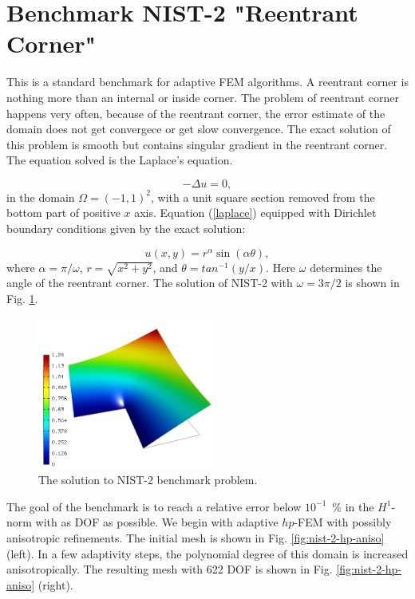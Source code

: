 \section{Benchmark NIST-2 "Reentrant Corner"}
\label{sec:bench-2}

This is a standard benchmark for adaptive FEM algorithms.
A reentrant corner is nothing more than an internal or inside corner.
The problem of reentrant corner happens very often,
because of the reentrant corner, the error estimate
of the domain does not get convergece or get slow convergence.
The exact solution of this problem is smooth but contains
singular gradient in the reentrant corner.
The equation solved is the Laplace's equation.

\begin{equation} \label{laplace}
-\Delta u = 0,
\end{equation}
in the domain $\Omega = (-1, 1)^2$, with a unit square
section removed from the bottom part of positive $x$ axis.
Equation (\ref{laplace}) equipped with Dirichlet
boundary conditions given by the exact solution:

\begin{equation}\label{exact-nist-2}
u(x, y) = r^{\alpha}\sin(\alpha \theta),
\end{equation}
where $\alpha = \pi / \omega$, $r = \sqrt{x^2+y^2}$,
and $\theta = tan^{-1}(y/x)$. Here $\omega $ determines
the angle of the reentrant corner.
The solution of NIST-2 with $\omega = 3 \pi / 2$
is shown in Fig. \ref{fig:sln-nist02}.

\begin{figure}[!ht]
\centering
\includegraphics[height=5cm]{nist/nist-2/solution.png}
\caption{The solution to NIST-2 benchmark problem.}
\label{fig:sln-nist02}
\end{figure}
\noindent

The goal of the benchmark is to reach a relative error below
$10^{-1}$~\% in the $H^1$-norm with as DOF 
as possible.
We begin with adaptive $hp$-FEM with possibly anisotropic refinements.
The initial mesh is shown in Fig. \ref{fig:nist-2-hp-aniso} (left).
In a few adaptivity steps, the polynomial degree of this domain is increased
anisotropically.
The resulting mesh with 622 DOF is shown in Fig. \ref{fig:nist-2-hp-aniso} (right).

